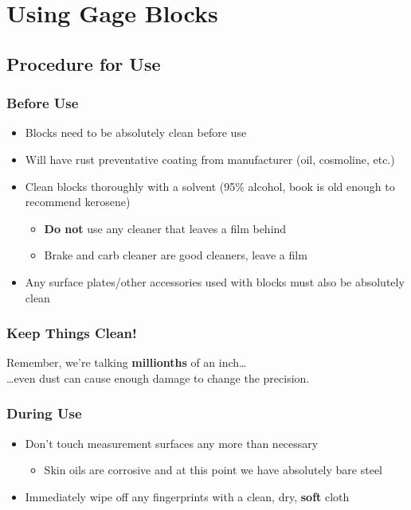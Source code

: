 \section{Using Gage Blocks}

\subsection{Procedure for Use}

\begin{frame}
	\frametitle{Before Use}

    \begin{itemize}[<+- | alert@+>]
        \item Blocks need to be absolutely clean before use
        \item Will have rust preventative coating from manufacturer (oil, cosmoline, etc.)
        \item Clean blocks thoroughly with a solvent (95\% alcohol, book is old enough to recommend kerosene)
            \begin{itemize}
                \item \textbf{Do not} use any cleaner that leaves a film behind
                \item Brake and carb cleaner are good cleaners, leave a film
            \end{itemize}
        \item Any surface plates/other accessories used with blocks must also be absolutely clean
    \end{itemize}
\end{frame}

\begin{frame}
	\frametitle{Keep Things Clean!}

    \centering
    Remember, we're talking \textbf{millionths} of an inch\dots \\
    \dots even dust can cause enough damage to change the precision.
\end{frame}

\begin{frame}
	\frametitle{During Use}
    \begin{itemize}[<+- | alert@+>]
        \item{Don't touch measurement surfaces any more than necessary}
            \begin{itemize}
                \item{Skin oils are corrosive and at this point we have absolutely bare steel}
            \end{itemize}
        \item{Immediately wipe off any fingerprints with a clean, dry, \textbf{soft} cloth}
    \end{itemize}
\end{frame}

